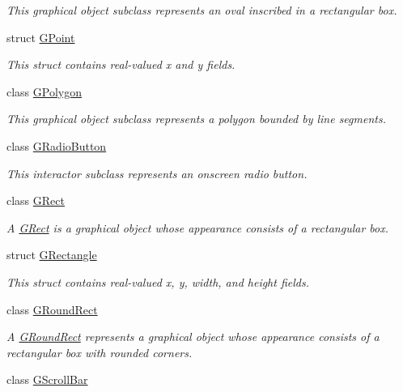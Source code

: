 \begin{DoxyCompactItemize}
\begin{DoxyCompactList}\small\item\em This graphical object subclass represents an oval inscribed in a rectangular box. \end{DoxyCompactList}\item 
struct \mbox{\hyperlink{structsgl_1_1GPoint}{G\+Point}}
\begin{DoxyCompactList}\small\item\em This struct contains real-\/valued x and y fields. \end{DoxyCompactList}\item 
class \mbox{\hyperlink{classsgl_1_1GPolygon}{G\+Polygon}}
\begin{DoxyCompactList}\small\item\em This graphical object subclass represents a polygon bounded by line segments. \end{DoxyCompactList}\item 
class \mbox{\hyperlink{classsgl_1_1GRadioButton}{G\+Radio\+Button}}
\begin{DoxyCompactList}\small\item\em This interactor subclass represents an onscreen radio button. \end{DoxyCompactList}\item 
class \mbox{\hyperlink{classsgl_1_1GRect}{G\+Rect}}
\begin{DoxyCompactList}\small\item\em A \mbox{\hyperlink{classsgl_1_1GRect}{G\+Rect}} is a graphical object whose appearance consists of a rectangular box. \end{DoxyCompactList}\item 
struct \mbox{\hyperlink{structsgl_1_1GRectangle}{G\+Rectangle}}
\begin{DoxyCompactList}\small\item\em This struct contains real-\/valued x, y, width, and height fields. \end{DoxyCompactList}\item 
class \mbox{\hyperlink{classsgl_1_1GRoundRect}{G\+Round\+Rect}}
\begin{DoxyCompactList}\small\item\em A \mbox{\hyperlink{classsgl_1_1GRoundRect}{G\+Round\+Rect}} represents a graphical object whose appearance consists of a rectangular box with rounded corners. \end{DoxyCompactList}\item 
class \mbox{\hyperlink{classsgl_1_1GScrollBar}{G\+Scroll\+Bar}}

\end{DoxyCompactItemize}
